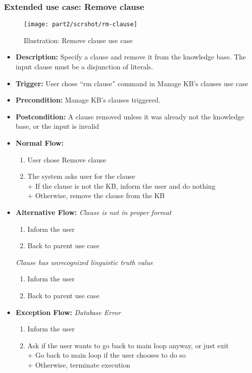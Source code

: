 \documentclass[../gr-final.tex]{subfiles}
\begin{document}
\subsubsection{Extended use case: Remove clause}
\begin{figure}[H]
  \centering
  \texttt{[image: part2/scrshot/rm-clause]}
  \caption{Illustration: Remove clause use case}
\end{figure}
\begin{itemize}
  \item {\bfseries Description:} Specify a clause and remove it from the
    knowledge base. The input clause must be a disjunction of literals.
  \item {\bfseries Trigger:} User chose ``rm clause'' command in
    Manage KB's clauses use case
  \item {\bfseries Precondition:} Manage KB's clauses triggered.
  \item {\bfseries Postcondition:} A clause removed unless it
    was already not the knowledge base, or the input is invalid   
  \item {\bfseries Normal Flow:}
    \begin{enumerate}
      \item User chose Remove clause
      \item The system asks user for the clause\\
        \indent + If the clause is not the KB, inform the
        user and do nothing   \\
        \indent + Otherwise, remove the clause from the KB        
    \end{enumerate}
  \item {\bfseries Alternative Flow:}
    {\em Clause is not in proper format}
    \begin{enumerate}
      \item Inform the user
      \item Back to parent use case
    \end{enumerate}
    {\em Clause has unrecognized linguistic truth value}
    \begin{enumerate}
      \item Inform the user
      \item Back to parent use case
    \end{enumerate}
  \item {\bfseries Exception Flow:}
    {\em Database Error}
    \begin{enumerate}
      \item Inform the user
      \item Ask if the user wants to go back to main loop anyway,
        or just exit\\
        \indent + Go back to main loop if the user chooses to do
        so\\
        \indent + Otherwise, terminate execution
    \end{enumerate}
\end{itemize}
\end{document}
